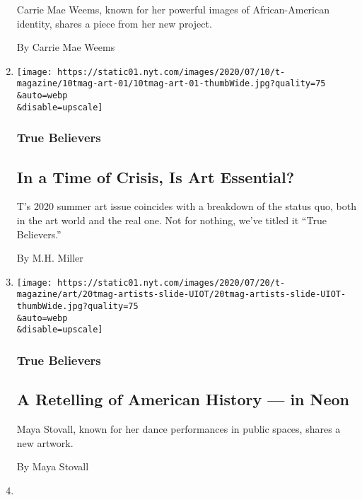 \begin{enumerate}
  Carrie Mae Weems, known for her powerful images of African-American
  identity, shares a piece from her new project.

  By Carrie Mae Weems
\item
  \href{/2020/07/20/t-magazine/museums-galleries-open-art.html}{}

  \texttt{[image: https://static01.nyt.com/images/2020/07/10/t-magazine/10tmag-art-01/10tmag-art-01-thumbWide.jpg?quality=75\\\&auto=webp\\\&disable=upscale]}

  \hypertarget{true-believers-10}{%
  \subsubsection{True Believers}\label{true-believers-10}}

  \hypertarget{in-a-time-of-crisis-is-art-essential-1}{%
  \subsection{In a Time of Crisis, Is Art
  Essential?}\label{in-a-time-of-crisis-is-art-essential-1}}

  T's 2020 summer art issue coincides with a breakdown of the status
  quo, both in the art world and the real one. Not for nothing, we've
  titled it ``True Believers.''

  By M.H. Miller
\item
  \href{/2020/07/20/t-magazine/maya-stovall.html}{}

  \texttt{[image: https://static01.nyt.com/images/2020/07/20/t-magazine/art/20tmag-artists-slide-UIOT/20tmag-artists-slide-UIOT-thumbWide.jpg?quality=75\\\&auto=webp\\\&disable=upscale]}

  \hypertarget{true-believers-11}{%
  \subsubsection{True Believers}\label{true-believers-11}}

  \hypertarget{a-retelling-of-american-history--in-neon}{%
  \subsection{A Retelling of American History --- in
  Neon}\label{a-retelling-of-american-history--in-neon}}

  Maya Stovall, known for her dance performances in public spaces,
  shares a new artwork.

  By Maya Stovall
\item
  \href{/2020/07/17/t-magazine/summer-recipes-arjamolho-soup-vanessa-barragao.html}{}


\end{enumerate}

